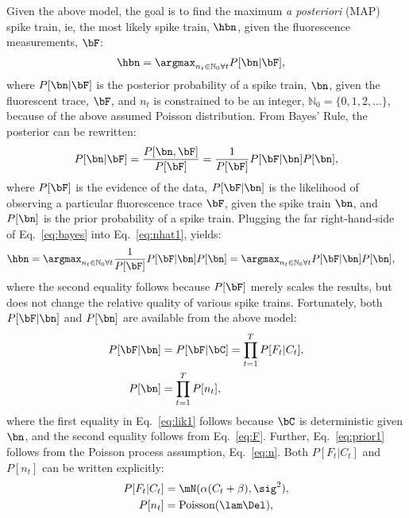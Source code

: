 Given the above model, the goal is to find the maximum \emph{a posteriori} (MAP) spike train, ie, the most likely spike train, $\hbn$,  given the fluorescence measurements, $\bF$:
\begin{align} \label{eq:nhat1} 
\hbn &=  \anx P[\bn | \bF], 
\end{align}
\noindent where $P[\bn | \bF]$ is the posterior probability of a spike train, $\bn$, given the fluorescent trace, $\bF$, and $n_t$ is constrained to be an integer, $\mathbb{N}_0=\{0,1,2,\ldots\}$, because of the above assumed Poisson distribution.  From Bayes' Rule, the posterior can be rewritten:
\begin{align} \label{eq:bayes}
P[\bn | \bF] = \frac{P[\bn, \bF]}{P[\bF]} = \frac{1}{P[\bF]} P[\bF | \bn] P[\bn],
\end{align}
\noindent where $P[\bF]$ is the evidence of the data, $P[\bF | \bn]$ is the likelihood of observing a particular fluorescence trace $\bF$, given the spike train $\bn$, and $P[\bn]$ is the prior probability of a spike train.  Plugging the far right-hand-side of Eq.~\eqref{eq:bayes} into Eq.~\eqref{eq:nhat1}, yields:
\begin{align} \label{eq:nhat2} 
\hbn &=  \anx \frac{1}{P[\bF]} P[\bF | \bn] P[\bn] =  \anx  P[\bF | \bn] P[\bn],
\end{align}
\noindent where the second equality follows because $P[\bF]$ merely scales the results, but does not change the relative quality of various spike trains.  Fortunately, both $P[\bF | \bn]$ and $P[\bn]$ are available from the above model:
\begin{subequations} \label{eq:post1}
\begin{align}
P[\bF | \bn]&= P[\bF | \bC] 	= \prod_{t=1}^T P[F_t | C_t], \label{eq:lik1} \\ 
P[\bn] 		&= \prod_{t=1}^T P[n_t], \label{eq:prior1}
\end{align}
\end{subequations}
\noindent where the first equality in Eq.~\eqref{eq:lik1} follows because $\bC$ is deterministic given $\bn$, and the second equality follows from Eq.~\eqref{eq:F}. Further, Eq.~\eqref{eq:prior1} follows from the Poisson process assumption, Eq.~\eqref{eq:n}.  Both $P[F_t | C_t]$ and $P[n_t]$ can be written explicitly:
\begin{subequations} \label{eq:post2}
\begin{align}
P[F_t | C_t] &= \mN(\alpha(C_t+\beta),\sig^2), \label{eq:lik2} \\
P[n_t] &= \text{Poisson}(\lam \Del), \label{eq:prior2} 
\end{align}
\end{subequations}
